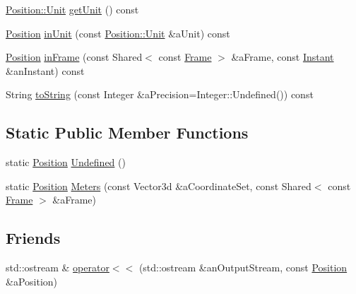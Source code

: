 \begin{DoxyCompactItemize}
\hyperlink{classlibrary_1_1physics_1_1units_1_1_length_a3b8b39cd245cf6b19dc34459baeccb18}{Position\+::\+Unit} \hyperlink{classlibrary_1_1physics_1_1coord_1_1_position_a1b6173fd9226069e36ac075b444be794}{get\+Unit} () const
\item 
\hyperlink{classlibrary_1_1physics_1_1coord_1_1_position}{Position} \hyperlink{classlibrary_1_1physics_1_1coord_1_1_position_a908878d741ad2de6a2d278d2d674e949}{in\+Unit} (const \hyperlink{classlibrary_1_1physics_1_1units_1_1_length_a3b8b39cd245cf6b19dc34459baeccb18}{Position\+::\+Unit} \&a\+Unit) const
\item 
\hyperlink{classlibrary_1_1physics_1_1coord_1_1_position}{Position} \hyperlink{classlibrary_1_1physics_1_1coord_1_1_position_af8dcfe9e1f9e172d2123ab38cd7b30c8}{in\+Frame} (const Shared$<$ const \hyperlink{classlibrary_1_1physics_1_1coord_1_1_frame}{Frame} $>$ \&a\+Frame, const \hyperlink{classlibrary_1_1physics_1_1time_1_1_instant}{Instant} \&an\+Instant) const
\item 
String \hyperlink{classlibrary_1_1physics_1_1coord_1_1_position_ab88010154fdbcb36b0e25b3986bcc80c}{to\+String} (const Integer \&a\+Precision=Integer\+::\+Undefined()) const
\end{DoxyCompactItemize}
\subsection*{Static Public Member Functions}
\begin{DoxyCompactItemize}
\item 
static \hyperlink{classlibrary_1_1physics_1_1coord_1_1_position}{Position} \hyperlink{classlibrary_1_1physics_1_1coord_1_1_position_a65f80401df5fa5c1eab7e3bdf1b8f8c5}{Undefined} ()
\item 
static \hyperlink{classlibrary_1_1physics_1_1coord_1_1_position}{Position} \hyperlink{classlibrary_1_1physics_1_1coord_1_1_position_a9ee5717230be48ee3f52e16383314ba0}{Meters} (const Vector3d \&a\+Coordinate\+Set, const Shared$<$ const \hyperlink{classlibrary_1_1physics_1_1coord_1_1_frame}{Frame} $>$ \&a\+Frame)
\end{DoxyCompactItemize}
\subsection*{Friends}
\begin{DoxyCompactItemize}
\item 
std\+::ostream \& \hyperlink{classlibrary_1_1physics_1_1coord_1_1_position_aab9f362c268370239ccad2c8a6d0eaee}{operator$<$$<$} (std\+::ostream \&an\+Output\+Stream, const \hyperlink{classlibrary_1_1physics_1_1coord_1_1_position}{Position} \&a\+Position)
\end{DoxyCompactItemize}


